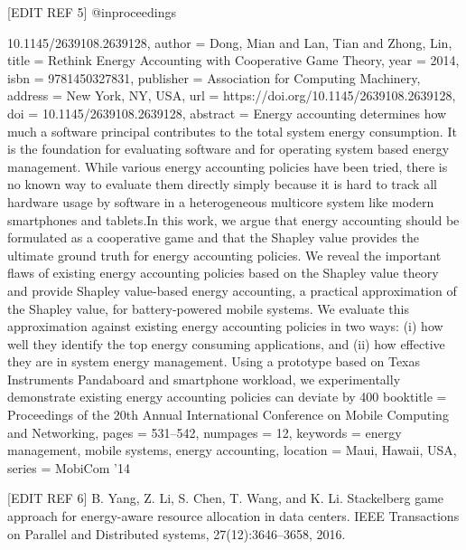 [EDIT REF 5] @inproceedings{10.1145/2639108.2639128,
author = {Dong, Mian and Lan, Tian and Zhong, Lin},
title = {Rethink Energy Accounting with Cooperative Game Theory},
year = {2014},
isbn = {9781450327831},
publisher = {Association for Computing Machinery},
address = {New York, NY, USA},
url = {https://doi.org/10.1145/2639108.2639128},
doi = {10.1145/2639108.2639128},
abstract = {Energy accounting determines how much a software principal contributes to the total system energy consumption. It is the foundation for evaluating software and for operating system based energy management. While various energy accounting policies have been tried, there is no known way to evaluate them directly simply because it is hard to track all hardware usage by software in a heterogeneous multicore system like modern smartphones and tablets.In this work, we argue that energy accounting should be formulated as a cooperative game and that the Shapley value provides the ultimate ground truth for energy accounting policies. We reveal the important flaws of existing energy accounting policies based on the Shapley value theory and provide Shapley value-based energy accounting, a practical approximation of the Shapley value, for battery-powered mobile systems. We evaluate this approximation against existing energy accounting policies in two ways: (i) how well they identify the top energy consuming applications, and (ii) how effective they are in system energy management. Using a prototype based on Texas Instruments Pandaboard and smartphone workload, we experimentally demonstrate existing energy accounting policies can deviate by 400%
booktitle = {Proceedings of the 20th Annual International Conference on Mobile Computing and Networking},
pages = {531–542},
numpages = {12},
keywords = {energy management, mobile systems, energy accounting},
location = {Maui, Hawaii, USA},
series = {MobiCom '14}
}

[EDIT REF 6] B. Yang, Z. Li, S. Chen, T. Wang, and K. Li. Stackelberg game approach
for energy-aware resource allocation in data centers. IEEE Transactions
on Parallel and Distributed systems, 27(12):3646–3658, 2016.


}
